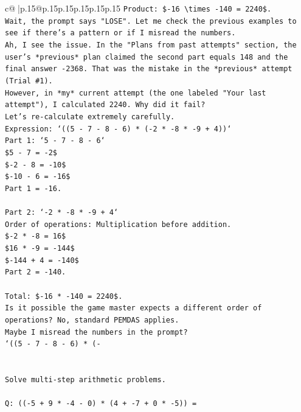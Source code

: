 \documentclass{article}
\begin{document}
{\begin{supertabular}{c@{$\;$}|p{.15\linewidth}@{}p{.15\linewidth}p{.15\linewidth}p{.15\linewidth}p{.15\linewidth}p{.15\linewidth}}
{{{\texttt{Product: \${-}16 \textbackslash{}times {-}140 = 2240\$.} \\
\texttt{Wait, the prompt says "LOSE". Let me check the previous examples to see if there's a pattern or if I misread the numbers.} \\
\texttt{Ah, I see the issue. In the "Plans from past attempts" section, the user's *previous* plan claimed the second part equals 148 and the final answer {-}2368. That was the mistake in the *previous* attempt (Trial \#1).} \\
\texttt{However, in *my* current attempt (the one labeled "Your last attempt"), I calculated 2240. Why did it fail?} \\
\texttt{Let's re{-}calculate extremely carefully.} \\
\texttt{Expression: `((5 {-} 7 {-} 8 {-} 6) * ({-}2 * {-}8 * {-}9 + 4))`} \\
\texttt{Part 1: `5 {-} 7 {-} 8 {-} 6`} \\
\texttt{\$5 {-} 7 = {-}2\$} \\
\texttt{\${-}2 {-} 8 = {-}10\$} \\
\texttt{\${-}10 {-} 6 = {-}16\$} \\
\texttt{Part 1 = {-}16.} \\
\\ 
\texttt{Part 2: `{-}2 * {-}8 * {-}9 + 4`} \\
\texttt{Order of operations: Multiplication before addition.} \\
\texttt{\${-}2 * {-}8 = 16\$} \\
\texttt{\$16 * {-}9 = {-}144\$} \\
\texttt{\${-}144 + 4 = {-}140\$} \\
\texttt{Part 2 = {-}140.} \\
\\ 
\texttt{Total: \${-}16 * {-}140 = 2240\$.} \\
\texttt{Is it possible the game master expects a different order of operations? No, standard PEMDAS applies.} \\
\texttt{Maybe I misread the numbers in the prompt?} \\
\texttt{`((5 {-} 7 {-} 8 {-} 6) * ({-}} \\
\\ 
\\ 
\texttt{Solve multi{-}step arithmetic problems.} \\
\\ 
\texttt{Q: (({-}5 + 9 * {-}4 {-} 0) * (4 + {-}7 + 0 * {-}5)) =} \\
}}}
\end{supertabular}}
\end{document}
